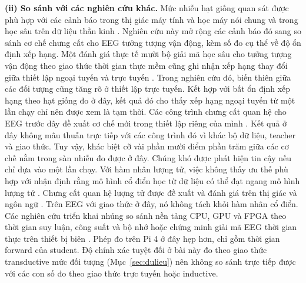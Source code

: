 \textbf{(ii) So sánh với các nghiên cứu khác.} Mức nhiễu hạt giống quan
sát được phù hợp với các cảnh báo trong thị giác máy tính và học máy nói
chung \cite{picard2021torch, bouthillier2021accounting} và trong học sâu
trên dữ liệu thần kinh \cite{delpup2024toward}. Nghiên cứu này mở rộng các
cảnh báo đó sang so sánh cơ chế chưng cất cho EEG tưởng tượng vận động,
kèm số đo cụ thể về độ ổn định xếp hạng. Một đánh giá thực tế mười bộ giải
mã học sâu cho tưởng tượng vận động theo giao thức thời gian thực mềm cũng ghi nhận xếp hạng thay đổi giữa thiết lập ngoại tuyến và trực tuyến
\cite{sedinzakuna2025realworld}. Trong nghiên cứu đó, biến thiên giữa các đối
tượng cũng tăng rõ ở thiết lập trực tuyến. Kết
hợp với bất ổn định xếp hạng theo hạt giống đo ở đây, kết quả đó cho thấy
xếp hạng ngoại tuyến từ một lần chạy chỉ nên được xem là tạm thời. Các công trình chưng cất quan hệ
cho EEG trước đây đề xuất cơ chế mới trong thiết lập riêng của mình
\cite{huang2024enhancing, wu2026multilevel}. Kết quả ở đây không mâu thuẫn
trực tiếp với các công trình đó vì khác bộ dữ liệu, teacher và giao thức.
Tuy vậy, khác biệt cỡ vài phần mười điểm phần trăm giữa các cơ chế nằm
trong sàn nhiễu đo được ở đây. Chúng khó được phát hiện tin cậy nếu chỉ dựa
vào một lần chạy. Với hàm nhân lượng tử, việc không thấy ưu thế phù hợp
với nhận định rằng mô hình cổ điển học từ dữ liệu có thể đạt ngang mô hình
lượng tử \cite{huang2021power}. Chưng cất quan hệ lượng tử được đề xuất và
đánh giá trên thị giác và ngôn ngữ \cite{liu2025quantum}. Trên EEG với
giao thức ở đây, nó không tách khỏi hàm nhân cổ điển. Các nghiên cứu triển
khai nhúng so sánh nền tảng CPU, GPU và FPGA theo thời gian suy luận, công
suất và bộ nhớ \cite{pacini2024design} hoặc chứng minh giải mã EEG thời gian
thực trên thiết bị biên \cite{sen2025lowlatency}. Phép đo trên Pi 4 ở đây
hẹp hơn, chỉ gồm thời gian forward của student. Độ chính xác tuyệt
đối ở bài này đo theo giao thức transductive mức đối tượng
(Mục~\ref{sec:dulieu}) nên không so sánh trực tiếp được với các con số đo
theo giao thức trực tuyến hoặc inductive.

